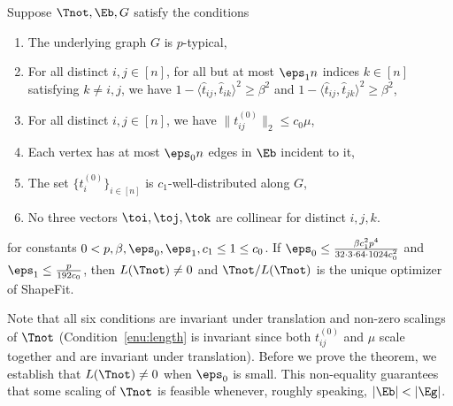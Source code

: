 \setcounter{theorem}{3}
\begin{theorem} \label{thm-deterministic-three-d}
Suppose $\Tnot, \Eb, G$ satisfy the conditions
\begin{enumerate}
  \setlength{\itemsep}{1pt} \setlength{\parskip}{0pt}
  \setlength{\parsep}{0pt}
	\item \label{enu:typical}The underlying graph $G$ is $p$-typical,
	\item \label{enu:angle}For all distinct $i,j\in[n]$, for all but at most $\eps_{1}n$ indices $k\in[n]$ satisfying $k \neq i,j$, we have $1-\langle\hat{t}_{ij},\hat{t}_{ik}\rangle^{2}\ge\beta^{2}$ and $1-\langle\hat{t}_{ij},\hat{t}_{jk}\rangle^{2}\ge\beta^{2}$,
	\item \label{enu:length}For all distinct $i,j\in[n]$, we have $\|t_{ij}^{(0)}\|_2\le c_{0}\mu$, 	\item \label{enu:bad}Each vertex has at most $\eps_0 n$ edges in $\Eb$ incident to it,
	\item \label{enu:welldistributed}The set $\{t_{i}^{(0)}\}_{i \in [n]}$ is $c_{1}$-well-distributed
along $G$,
	\item \label{enu:general}No three vectors $\toi, \toj, \tok$ are collinear for distinct $i,j,k$.
\end{enumerate}
for constants $0< p, \beta, \eps_0, \eps_1, c_{1} \leq 1 \le c_0$.  If $\eps_0 \leq \frac{\beta c_1^2 p^4}{32 \cdot 3 \cdot 64 \cdot 1024 c_0^2}$ and $\eps_1 \le \frac{p}{192c_0}$, then $L(\Tnot)\neq 0$ and $\Tnot / L(\Tnot)$ is the unique optimizer of ShapeFit.
\end{theorem}

Note that all six 
conditions are invariant under translation and non-zero scalings of $\Tnot$ (Condition~\ref{enu:length}
is invariant since both $t_{ij}^{(0)}$ and $\mu$ scale together and are invariant under translation).
Before we prove the theorem, we establish that $L(\Tnot)\neq 0$ when $\eps_0$ is small.  This non-equality guarantees that some scaling of $\Tnot$ is feasible whenever, roughly speaking, $|\Eb| < |\Eg|$.


